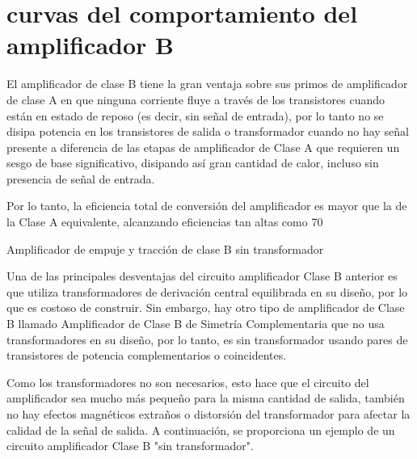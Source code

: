 \documentclass[10pt,a4paper]{article}
\begin{document}
\section{curvas del comportamiento del amplificador B}
El amplificador de clase B tiene la gran ventaja sobre sus primos de amplificador de clase A en que ninguna corriente fluye a través de los transistores cuando están en estado de reposo (es decir, sin señal de entrada), por lo tanto no se disipa potencia en los transistores de salida o transformador cuando no hay señal presente a diferencia de las etapas de amplificador de Clase A que requieren un sesgo de base significativo, disipando así gran cantidad de calor, incluso sin presencia de señal de entrada.

Por lo tanto, la eficiencia total de conversión del amplificador es mayor que la de la Clase A equivalente, alcanzando eficiencias tan altas como 70%

Amplificador de empuje y tracción de clase B sin transformador

Una de las principales desventajas del circuito amplificador Clase B anterior es que utiliza transformadores de derivación central equilibrada en su diseño, por lo que es costoso de construir. Sin embargo, hay otro tipo de amplificador de Clase B llamado Amplificador de Clase B de Simetría Complementaria que no usa transformadores en su diseño, por lo tanto, es sin transformador usando pares de transistores de potencia complementarios o coincidentes.

Como los transformadores no son necesarios, esto hace que el circuito del amplificador sea mucho más pequeño para la misma cantidad de salida, también no hay efectos magnéticos extraños o distorsión del transformador para afectar la calidad de la señal de salida. A continuación, se proporciona un ejemplo de un circuito amplificador Clase B "sin transformador".
\end{document}

